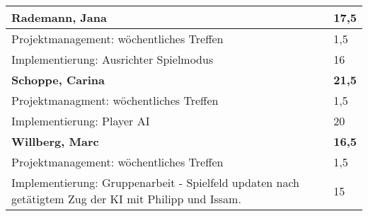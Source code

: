 \documentclass[a4paper,11pt]{scrartcl}
\begin{document}
\begin{longtable}{| p{13.8cm} | C{2.4cm} |}
	\textbf{Rademann, Jana} & \textbf{17,5}\\ %
	\hline

  Projektmanagement: wöchentliches Treffen
	&
  1,5
	\\
	\hline

  Implementierung: Ausrichter Spielmodus
	&
  16
	\\
	\hline
	\hline


	\textbf{Schoppe, Carina} & \textbf{21,5}\\ %
	\hline

  Projektmanagment: wöchentliches Treffen
	&
  1,5
	\\
	\hline

  Implementierung: Player AI
	&
  20
	\\
	\hline
	\hline


	\textbf{Willberg, Marc} & \textbf{16,5}\\ %
	\hline

  Projektmanagement: wöchentliches Treffen
	&
  1,5
	\\
	\hline

  Implementierung: Gruppenarbeit - Spielfeld updaten nach getätigtem Zug der KI mit Philipp und Issam.
	&
  15
	\\
	\hline

\end{longtable}
\end{document}
